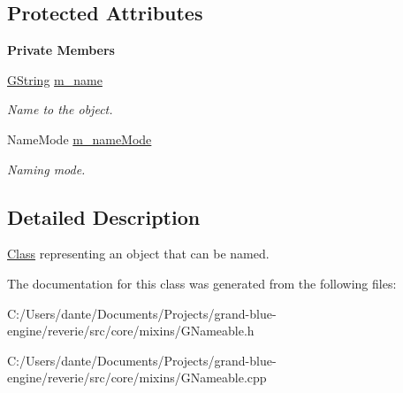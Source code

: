\subsection*{Protected Attributes}
\begin{Indent}\textbf{ Private Members}\par
\begin{DoxyCompactItemize}
\item 
\mbox{\label{classrev_1_1_nameable_afe062b870ee1b0dbf201238c2f0ba487}} 
\mbox{\hyperlink{classrev_1_1_g_string}{G\+String}} \mbox{\hyperlink{classrev_1_1_nameable_afe062b870ee1b0dbf201238c2f0ba487}{m\+\_\+name}}
\begin{DoxyCompactList}\small\item\em Name to the object. \end{DoxyCompactList}\item 
\mbox{\label{classrev_1_1_nameable_a10231ad7197f75d953c734ba89b042f4}} 
Name\+Mode \mbox{\hyperlink{classrev_1_1_nameable_a10231ad7197f75d953c734ba89b042f4}{m\+\_\+name\+Mode}}
\begin{DoxyCompactList}\small\item\em Naming mode. \end{DoxyCompactList}\end{DoxyCompactItemize}
\end{Indent}


\subsection{Detailed Description}
\mbox{\hyperlink{struct_class}{Class}} representing an object that can be named. 

The documentation for this class was generated from the following files\+:\begin{DoxyCompactItemize}
\item 
C\+:/\+Users/dante/\+Documents/\+Projects/grand-\/blue-\/engine/reverie/src/core/mixins/G\+Nameable.\+h\item 
C\+:/\+Users/dante/\+Documents/\+Projects/grand-\/blue-\/engine/reverie/src/core/mixins/G\+Nameable.\+cpp\end{DoxyCompactItemize}
